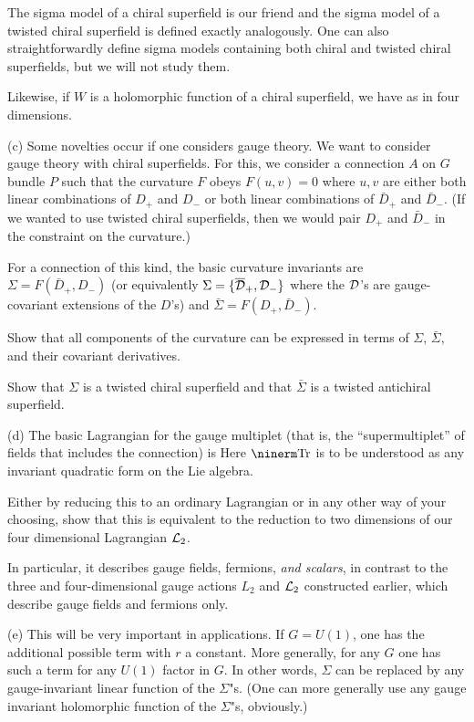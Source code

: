 The sigma model of a chiral superfield is
our friend
\eqn{}
and the sigma model of a twisted chiral superfield is defined
exactly analogously.  One can also straightforwardly define
sigma models containing both chiral and twisted chiral superfields,
but we will not study them.

Likewise, if $W$ is a holomorphic function of a chiral superfield,
we have
\eqn{}
as in four dimensions.

(c) Some novelties occur if one considers gauge theory.
We want to consider gauge theory with chiral superfields.
For this, we consider a connection $A$ on $G$ bundle $P$ such
that the curvature $F$ obeys $F(u,v)=0$ where $u,v$ are either
both linear combinations of $D_+$ and $D_-$
or both linear combinations of $\bar D_+ $ and $\bar D_-$.
(If we wanted to use twisted chiral superfields, then we would
pair $D_+$ and $\bar D_-$ in the constraint on the curvature.)

For a connection of this kind, the basic curvature invariants are
$\Sigma=F(\bar D_+,D_-)$ (or equivalently $\Sigma=\{\overline {{\cal D}}_+,{\cal D}_-\}$
where the ${\cal D}$'s are gauge-covariant extensions of the $D$'s)
and $\bar \Sigma=F(D_+,\bar D_-)$.

Show that all components of the curvature can be expressed in terms
of $\Sigma$, $\bar \Sigma$, and their covariant derivatives.  

Show that $\Sigma$ is a twisted chiral superfield and that $\bar\Sigma$
is a twisted antichiral superfield.

(d) The basic Lagrangian for the gauge multiplet (that is, the 
``supermultiplet'' of fields that includes the connection) is
\eqn{}
Here $\Tr $ is to be understood as any invariant
quadratic form on the Lie
algebra.


Either by reducing this to an ordinary Lagrangian or in any other
way of your choosing, show that this is  equivalent to the reduction
to two dimensions of our four dimensional Lagrangian ${\cal L}_2$.

In particular, it describes gauge fields, fermions, {\it and scalars},
in contrast to the three and four-dimensional gauge actions
$L_2$ and ${\cal L}_2$ constructed earlier, which describe gauge fields
and fermions only.

(e) This will be very important in applications.  If $G=U(1)$,
 one has the additional possible term
\eqn{}
with $r$ a constant.
More generally, for any $G$ one has such a term for any $U(1)$ factor
in $G$.    In other words, $\Sigma$ can be replaced by any gauge-invariant
linear function of the $\Sigma$"s.  (One can more generally use
any gauge invariant holomorphic function of the $\Sigma$"s, obviously.)

